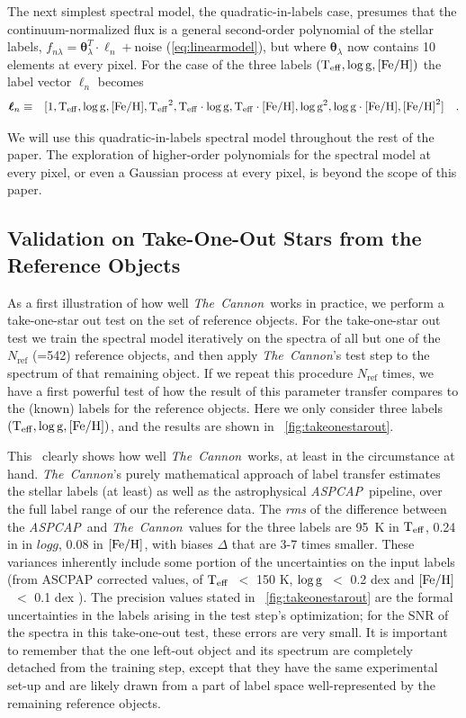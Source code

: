 \documentclass[12pt, preprint]{aastex}
\newcommand{\tc}{\textsl{The~Cannon}}
\newcommand{\aspcap}{\textsl{ASPCAP}}
\newcommand{\set}[1]{\bm{#1}}
\newcommand{\starlabel}{\ell}
\newcommand{\starlabelvec}{\set{\starlabel}}
\newcommand{\teff}{\mbox{$\rm T_{eff}$}}
\newcommand{\feh}{\mbox{$\rm [Fe/H]$}}
\newcommand{\logg}{\mbox{$\rm \log g$}}
\newcommand{\rfn}{\mathrm{ref}}
\begin{document}
The next simplest spectral model, the quadratic-in-labels case,
 presumes that the continuum-normalized flux is a general second-order polynomial of the stellar labels, $f_{n\lambda} =
\set{\theta}_\lambda^T \cdot \starlabelvec_n + \mbox{noise}$ 
(\ref{eq:linearmodel}), 
but where $\set{\theta}_\lambda$ now contains 10 elements at every pixel.
For the case of the three labels $(\teff , \logg , \feh)$ the label vector $\starlabelvec_n$
becomes  
\begin{eqnarray}
\starlabelvec_n &\equiv&
[1, \teff, \logg, \feh, \teff^2, \teff\cdot\logg, \teff\cdot\feh, \logg^2, \logg\cdot\feh, \feh^2]
 \label{eq:quadinthreelabels}\quad.
\end{eqnarray}


We will use this quadratic-in-labels spectral model throughout the rest of the paper.  The exploration of higher-order polynomials for the spectral model at every pixel, or even a Gaussian process at every pixel, is beyond the scope of this paper. 
 
\subsection{Validation on Take-One-Out Stars from the Reference Objects}
\label{sec:take-one-out}

As a first illustration of how well \tc\ works in practice, we perform a take-one-star out test on the set of reference objects.
For the take-one-star out test we train the spectral model iteratively on the spectra of all but one of the $N_\rfn$ (=542) 
reference objects, and then apply \tc 's test step to the spectrum of that remaining object. If we repeat this procedure $N_\rfn$ times, 
we have a first powerful test of how the result of this parameter transfer compares to the (known) labels for the reference objects.
 Here we only consider three labels $(\teff , \logg , \feh)$, and the results are shown in \figurename~\ref{fig:takeonestarout}.

This \figurename\ clearly shows how well \tc\ works, at least in the circumstance at hand.
\tc 's purely mathematical approach of label transfer estimates the stellar labels (at least) as well as the astrophysical \aspcap\ pipeline,
over the full label range of our the reference data. The \textit{rms} of the difference between the \aspcap\ and \tc\ values for the three labels are
95~K in $\teff$, 0.24 in in $logg$, 0.08 in $\feh$, with biases $\Delta$ that are 3-7 times smaller.  
These variances inherently include some portion of the uncertainties on the input labels (from ASCPAP corrected values, 
of \teff\ $<$ 150 K, \logg\ $<$ 0.2 dex and \feh\ $<$ 0.1 dex \citep{Meszaros2013}).
The precision values stated in \figurename~\ref{fig:takeonestarout} are the formal uncertainties in the labels arising 
in the test step's optimization; for the SNR of the spectra in this take-one-out test, these errors are very small.
It is important to remember that the one left-out object and its spectrum are completely detached from the training step, 
except that they have the same experimental set-up and are likely drawn from a part of label space well-represented by the remaining reference objects.
\end{document}
